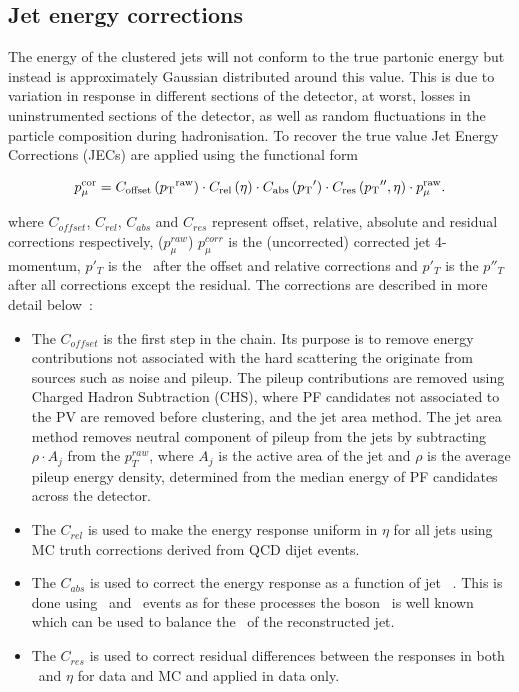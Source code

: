 \subsection{Jet energy corrections}
\label{sec:jec}
The energy of the clustered jets will not conform to the true partonic energy but instead is approximately Gaussian distributed around this value.
This is due to variation in response in different sections of the detector, at worst, losses in uninstrumented sections of the detector, as well as 
random fluctuations in the particle composition during hadronisation. To recover the true value Jet Energy Corrections (JECs) are applied using the functional
form~\cite{jec}

\begin{equation}
\label{equ:jec}
  p_{\mu}^{\rm{cor}}=C_{\rm{offset}}\left({p_{\text T}}^{\rm{raw}}\right)\cdot
  C_{\rm{rel}}\left(\eta\right)\cdot C_{\rm{abs}}\left({p_{\text T}}'\right)\cdot
  C_{\rm{res}}\left({p_{\text T}}'',\eta\right)\cdot p_{\mu}^{\rm{raw}}.
\end{equation}

where $C_{offset}$, $C_{rel}$, $C_{abs}$ and $C_{res}$ represent offset,
relative, absolute and residual corrections respectively, 
 ($p_{\mu}^{raw}$) $p_{\mu}^{corr}$ is the (uncorrected) corrected jet 4-momentum, $p'_T$ is the \pt~after the 
 offset and relative corrections and  $p'_T$ is the $p''_T$ after
all corrections except the residual. The corrections are described in more detail below~\cite{jec2}:

\begin{itemize}
\item The $C_{offset}$ is the first step in the chain. Its purpose is to remove
energy contributions not associated with the hard scattering the originate from sources
such as noise and pileup. The pileup contributions are removed using Charged
Hadron Subtraction (CHS), where PF candidates not associated to the PV
are removed before clustering, and the jet area method. The jet area method removes neutral component 
of pileup from the jets by subtracting $\rho \cdot A_j$
from the $p^{raw}_T$, where $A_j$ is the active area of the jet and $\rho$ 
is the average pileup energy density, determined from the median energy of PF candidates
across the detector. 
\item The $C_{rel}$ is used to make the energy response uniform in $\eta$ for all jets using MC truth corrections derived from QCD dijet events.
\item The $C_{abs}$ is used to correct the energy response as a function of jet \pt~. This is done using \zj~and \gj~events as for
these processes the boson \pt~is well known which can be used to balance the \pt~of the reconstructed jet.
\item The $C_{res}$ is used to correct residual differences between the responses in both \pt~and $\eta$ for data and MC and applied in data only.
\end{itemize}

